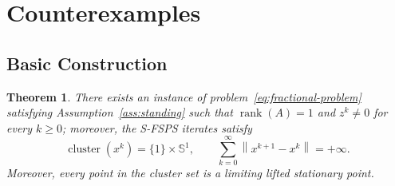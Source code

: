 \documentclass[11pt]{article}
\numberwithin{equation}{section}
\newtheorem{theorem}{Theorem}[section]
\newcommand{\norm}[1]{\left\lVert #1\right\rVert}
\newcommand{\Sph}{\mathbb S}
\newcommand{\clust}{\operatorname{cluster}}
\DeclareMathOperator{\rank}{rank}
\begin{document}
\section{Counterexamples}\label{sec:construction}
\subsection{Basic Construction}
\begin{theorem}\label{thm:main-counterexample}
There exists an instance of problem~\eqref{eq:fractional-problem}
satisfying Assumption~\ref{ass:standing} such that  ${\rank}(A)=1$ and $z^k\neq0$ for every $k\ge 0$; moreover, the S-FSPS iterates satisfy
\[
\clust(x^k)=\{1\}\times\Sph^1,
\qquad
\sum_{k=0}^{\infty}\norm{x^{k+1}-x^k}=+\infty.
\]
Moreover, every point in the cluster set is a limiting lifted stationary point.
\end{theorem}
\end{document}
